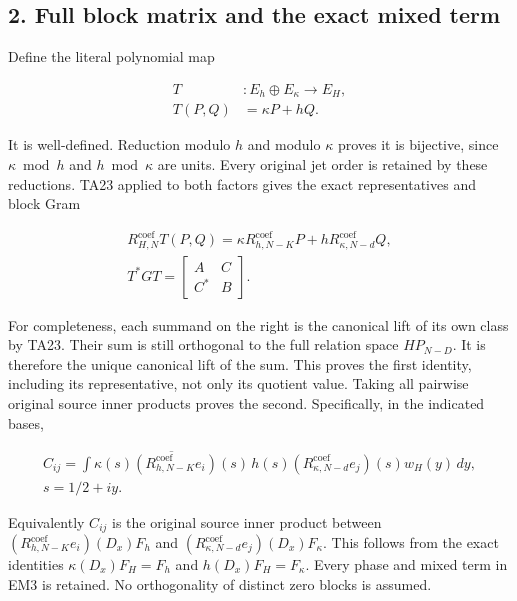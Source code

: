 \subsection{2. Full block matrix and the exact mixed term}\label{full-block-matrix-and-the-exact-mixed-term}

Define the literal polynomial map

\[
\begin{aligned}T&:E_h\oplus E_\kappa\longrightarrow E_H,\\T(P,Q)&=\kappa P+hQ.\end{aligned}\tag{EM1}
\]

It is well-defined. Reduction modulo \(h\) and modulo \(\kappa\) proves it is
bijective, since \(\kappa\bmod h\) and \(h\bmod\kappa\) are units. Every original
jet order is retained by these reductions. TA23 applied to both factors
gives the exact representatives and block Gram

\[
\begin{gathered}R_{H,N}^{\mathrm{coef}}T(P,Q)=\kappa R_{h,N-K}^{\mathrm{coef}}P+hR_{\kappa,N-d}^{\mathrm{coef}}Q,\\T^*GT=\begin{bmatrix}A&C\\C^*&B\end{bmatrix}.\end{gathered}\tag{EM2}
\]

For completeness, each summand on the right is the canonical lift of
its own class by TA23. Their sum is still orthogonal to the full relation
space \(HP_{N-D}\). It is therefore the unique canonical lift of the sum.
This proves the first identity, including its representative, not only
its quotient value. Taking all pairwise original source inner products
proves the second. Specifically, in the indicated bases,

\[
\begin{gathered}C_{ij}=\int\overline{\kappa(s)(R_{h,N-K}^{\mathrm{coef}}e_i)(s)}\,h(s)(R_{\kappa,N-d}^{\mathrm{coef}}e_j)(s)w_H(y)\,dy,\\s=1/2+iy.\end{gathered}\tag{EM3}
\]

Equivalently \(C_{ij}\) is the original source inner product between
\((R_{h,N-K}^{\mathrm{coef}}e_i)(D_x)F_h\) and
\((R_{\kappa,N-d}^{\mathrm{coef}}e_j)(D_x)F_\kappa\). This follows from the exact identities
\(\kappa(D_x)F_H=F_h\) and \(h(D_x)F_H=F_\kappa\). Every phase and mixed term in
EM3 is retained. No orthogonality of distinct zero blocks is assumed.

